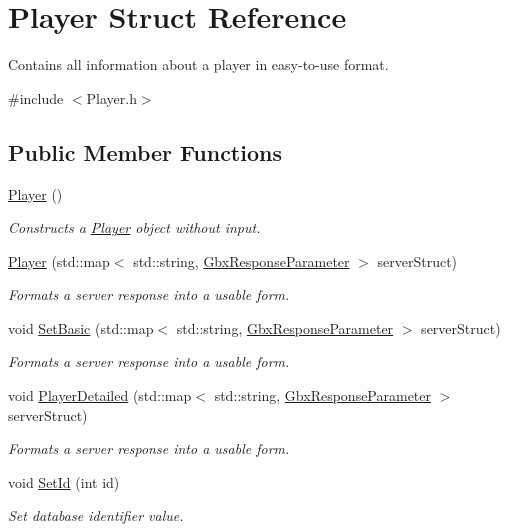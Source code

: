 \hypertarget{structPlayer}{\section{Player Struct Reference}
\label{structPlayer}
}


Contains all information about a player in easy-\/to-\/use format.  




{\ttfamily \#include $<$Player.\-h$>$}

\subsection*{Public Member Functions}
\begin{DoxyCompactItemize}
\item 
\hypertarget{structPlayer_affe0cc3cb714f6deb4e62f0c0d3f1fd8}{\hyperlink{structPlayer_affe0cc3cb714f6deb4e62f0c0d3f1fd8}{Player} ()}\label{structPlayer_affe0cc3cb714f6deb4e62f0c0d3f1fd8}

\begin{DoxyCompactList}\small\item\em Constructs a \hyperlink{structPlayer}{Player} object without input. \end{DoxyCompactList}\item 
\hyperlink{structPlayer_adf15eb006b535a4e1b72b419021f1f11}{Player} (std\-::map$<$ std\-::string, \hyperlink{classGbxResponseParameter}{Gbx\-Response\-Parameter} $>$ server\-Struct)
\begin{DoxyCompactList}\small\item\em Formats a server response into a usable form. \end{DoxyCompactList}\item 
void \hyperlink{structPlayer_afa8ea116543628f0129b5fb1cb17f2ef}{Set\-Basic} (std\-::map$<$ std\-::string, \hyperlink{classGbxResponseParameter}{Gbx\-Response\-Parameter} $>$ server\-Struct)
\begin{DoxyCompactList}\small\item\em Formats a server response into a usable form. \end{DoxyCompactList}\item 
void \hyperlink{structPlayer_a4e7c4a5bfc6fe42e23069a79f495b461}{Player\-Detailed} (std\-::map$<$ std\-::string, \hyperlink{classGbxResponseParameter}{Gbx\-Response\-Parameter} $>$ server\-Struct)
\begin{DoxyCompactList}\small\item\em Formats a server response into a usable form. \end{DoxyCompactList}\item 
void \hyperlink{structPlayer_a8541713f4fceaf4d03745e9407c3c303}{Set\-Id} (int id)
\begin{DoxyCompactList}\small\item\em Set database identifier value. \end{DoxyCompactList}\end{DoxyCompactItemize}

